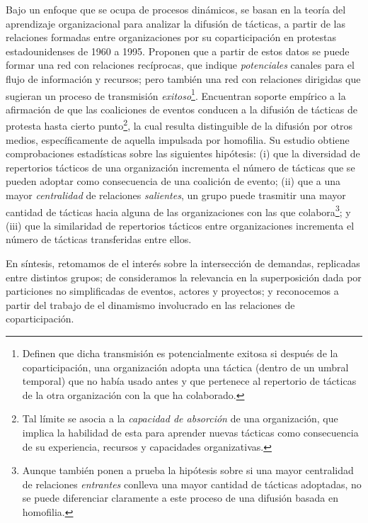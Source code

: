 \documentclass[letterpaper, 11pt]{book}
\theoremstyle{definition}
\theoremstyle{remark}
\begin{document}
Bajo un enfoque que se ocupa de procesos dinámicos, \citet{2012_Wand_andSoule_ColabiracionOMS} se basan en la teoría del aprendizaje organizacional para analizar la difusión de tácticas, a partir de las relaciones formadas entre organizaciones por su coparticipación en protestas estadounidenses de 1960 a 1995. 
Proponen que a partir de estos datos se puede formar una red con relaciones recíprocas, que indique \emph{potenciales} canales para el flujo de información y recursos; pero también una red con relaciones dirigidas que sugieran un proceso de transmisión \emph{exitoso}\footnote{
    Definen que dicha transmisión es potencialmente exitosa si después de la coparticipación, una organización adopta una táctica (dentro de un umbral temporal) que no había usado antes y que pertenece al repertorio de tácticas de la otra organización con la que ha colaborado. 
}. 
Encuentran soporte empírico a la afirmación de que las coaliciones de eventos conducen a la difusión de tácticas de protesta hasta cierto punto\footnote{
    Tal límite se asocia a la \emph{capacidad de absorción} de una organización, que implica la habilidad de esta para aprender nuevas tácticas como consecuencia de su experiencia, recursos y capacidades organizativas. 
}, 
la cual resulta distinguible de la difusión por otros medios, específicamente de aquella impulsada por homofilia. 
Su estudio obtiene comprobaciones estadísticas sobre las siguientes hipótesis: 
(i) que la diversidad de repertorios tácticos de una organización incrementa el número de tácticas que se pueden adoptar como consecuencia de una coalición de evento; 
(ii) que a una mayor \emph{centralidad} de relaciones \emph{salientes}, un grupo puede trasmitir una mayor cantidad de tácticas hacia alguna de las organizaciones con las que colabora\footnote{
   Aunque también ponen a prueba la hipótesis sobre si una mayor centralidad de relaciones \emph{entrantes} conlleva una mayor cantidad de tácticas adoptadas, no se puede diferenciar claramente a este proceso de una difusión basada en homofilia. 
}; y  
(iii) que la similaridad de repertorios tácticos entre organizaciones incrementa el número de tácticas transferidas entre ellos. 


En síntesis, retomamos de \citet{1993_BrmanEvtt_StructureSocialProtest} el interés sobre la intersección de demandas, replicadas entre distintos grupos; 
de \citet{2000_MischePattison_civicArena} consideramos la relevancia en la superposición dada por particiones no simplificadas de eventos, actores y proyectos; 
y reconocemos a partir del trabajo de \citet{2012_Wand_andSoule_ColabiracionOMS} el dinamismo involucrado en las relaciones de coparticipación. 
\end{document}
